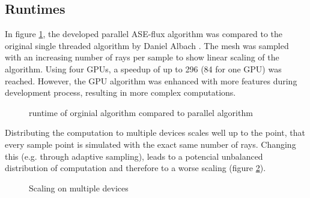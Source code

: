\subsection{Runtimes}
In figure \ref{plot:runtime}, the developed parallel ASE-flux algorithm was compared to 
the original single threaded algorithm by Daniel Albach
\cite{ASE2010}. The mesh was sampled with an increasing number of rays per sample
to show linear scaling of the algorithm. Using four GPUs, a speedup of up to 
296 (84 for one GPU) was reached. However, the GPU algorithm was enhanced with
more features during development process, resulting in more complex computations.
\begin{figure}[H]
  \centerline{
    }
  \caption{runtime of orginial algorithm compared to parallel algorithm}
  \label{plot:runtime}
\end{figure}
Distributing the computation to multiple devices scales well up to the
point, that every sample point is simulated with the exact same number
of rays. Changing this (e.g. through adaptive sampling), leads to
a potencial unbalanced distribution of computation and therefore to
a worse scaling (figure \ref{plot:gpu_scaling}).
\begin{figure}[H]
  \centerline{
    }
  \caption{Scaling on multiple devices}
  \label{plot:gpu_scaling}
\end{figure}
